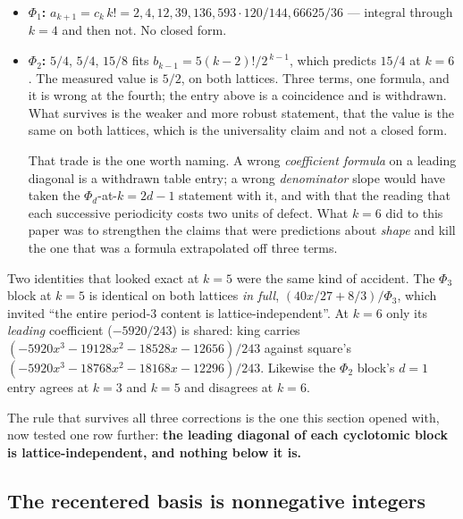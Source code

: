 \documentclass[11pt]{article}
\newcommand{\Phid}{\Phi}
\begin{document}
\begin{itemize}
\item \textbf{$\Phid_1$:} $a_{k+1} = c_k\,k! = 2, 4, 12, 39, 136,
  593\cdot120/144, 66625/36$ --- integral through $k = 4$ and then not. No
  closed form.
\item \textbf{$\Phid_2$:} $5/4$, $5/4$, $15/8$ fits $b_{k-1} =
  5(k-2)!/2^{\,k-1}$, which predicts $15/4$ at $k = 6$. The measured value is
  \textbf{$5/2$}, on both lattices. Three terms, one formula, and it is wrong at
  the fourth; the entry above is a coincidence and is withdrawn. What survives
  is the weaker and more robust statement, that the value is the same on both
  lattices, which is the universality claim and not a closed form.

  That trade is the one worth naming. A wrong \emph{coefficient formula} on a
  leading diagonal is a withdrawn table entry; a wrong \emph{denominator}
  slope would have taken the $\Phid_d$-at-$k = 2d-1$ statement with it, and
  with that the reading that each successive periodicity costs two units of
  defect. What $k = 6$ did to this paper was to strengthen the claims that were
  predictions about \emph{shape} and kill the one that was a formula
  extrapolated off three terms.
\end{itemize}

Two identities that looked exact at $k = 5$ were the same kind of accident. The
$\Phid_3$ block at $k = 5$ is identical on both lattices \emph{in full},
$(40x/27 + 8/3)/\Phid_3$, which invited ``the entire period-$3$ content is
lattice-independent''. At $k = 6$ only its \emph{leading} coefficient
($-5920/243$) is shared: king carries
$(-5920x^3 - 19128x^2 - 18528x - 12656)/243$ against square's
$(-5920x^3 - 18768x^2 - 18168x - 12296)/243$. Likewise the $\Phid_2$ block's
$d = 1$ entry agrees at $k = 3$ and $k = 5$ and disagrees at $k = 6$.

The rule that survives all three corrections is the one this section opened
with, now tested one row further: \textbf{the leading diagonal of
each cyclotomic block is lattice-independent, and nothing below it is.}

\subsection{The recentered basis is nonnegative integers}
\end{document}
